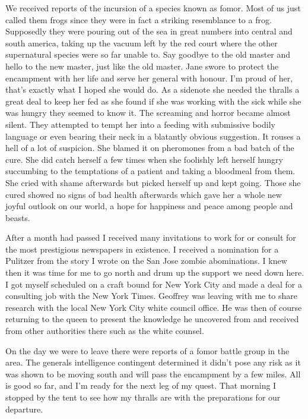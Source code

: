 We received reports of the incursion of a species known as fomor. Most of us just called them frogs since they were in fact a striking resemblance to a frog. Supposedly they were pouring out of the sea in great numbers into central and south america, taking up the vacuum left by the red court where the other supernatural species were so far unable to. Say goodbye to the old master and hello to the new master, just like the old master. Jane swore to protect the encampment with her life and serve her general with honour. I'm proud of her, that's exactly what I hoped she would do. As a sidenote she needed the thralls a great deal to keep her fed as she found if she was working with the sick while she was hungry they seemed to know it. The screaming and horror became almost silent. They attempted to tempt her into a feeding with submissive bodily language or even bearing their neck in a blatantly obvious suggestion. It rouses a hell of a lot of suspicion. She blamed it on pheromones from a bad batch of the cure. She did catch herself a few times when she foolishly left herself hungry succumbing to the temptations of a patient and taking a bloodmeal from them. She cried with shame afterwards but picked herself up and kept going. Those she cured showed no signs of bad health afterwards which gave her a whole new joyful outlook on our world, a hope for happiness and peace among people and beasts.

After a month had passed I received many invitations to work for or consult for the most prestigious newspapers in existence. I received a nomination for a Pulitzer from the story I wrote on the San Jose zombie abominations. I knew then it was time for me to go north and drum up the support we need down here. I got myself scheduled on a craft bound for New York City and made a deal for a consulting job with the New York Times. Geoffrey was leaving with me to share \chichenitza* research with the local New York City white council office. He was then of course returning to the queen to present the knowledge he uncovered from \chichenitza* and received from other authorities there such as the white counsel.

On the day we were to leave there were reports of a fomor battle group in the area. The generals intelligence contingent determined it didn't pose any risk as it was shown to be moving south and will pass the encampment by a few miles. All is good so far, and I'm ready for the next leg of my quest. That morning I stopped by the tent to see how my thralls are with the preparations for our departure.